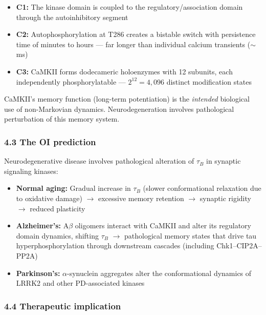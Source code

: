 \documentclass[
  11pt,
]{article}
\providecommand{\tightlist}{%
  \setlength{\itemsep}{0pt}\setlength{\parskip}{0pt}}
\begin{document}
\begin{itemize}
\tightlist
\item
  \textbf{C1:} The kinase domain is coupled to the
  regulatory/association domain through the autoinhibitory segment
\item
  \textbf{C2:} Autophosphorylation at T286 creates a bistable switch
  with persistence time of minutes to hours --- far longer than
  individual calcium transients (\(\sim\)ms)
\item
  \textbf{C3:} CaMKII forms dodecameric holoenzymes with 12 subunits,
  each independently phosphorylatable --- \(2^{12} = 4{,}096\) distinct
  modification states
\end{itemize}

CaMKII's memory function (long-term potentiation) is the \emph{intended}
biological use of non-Markovian dynamics. Neurodegeneration involves
pathological perturbation of this memory system.

\hypertarget{the-oi-prediction}{%
\subsubsection{4.3 The OI prediction}\label{the-oi-prediction}}

Neurodegenerative disease involves pathological alteration of \(\tau_B\)
in synaptic signaling kinases:

\begin{itemize}
\tightlist
\item
  \textbf{Normal aging:} Gradual increase in \(\tau_B\) (slower
  conformational relaxation due to oxidative damage) \(\to\) excessive
  memory retention \(\to\) synaptic rigidity \(\to\) reduced plasticity
\item
  \textbf{Alzheimer's:} A\(\beta\) oligomers interact with CaMKII and
  alter its regulatory domain dynamics, shifting \(\tau_B\) \(\to\)
  pathological memory states that drive tau hyperphosphorylation through
  downstream cascades (including Chk1--CIP2A--PP2A)
\item
  \textbf{Parkinson's:} \(\alpha\)-synuclein aggregates alter the
  conformational dynamics of LRRK2 and other PD-associated kinases
\end{itemize}

\hypertarget{therapeutic-implication}{%
\subsubsection{4.4 Therapeutic
implication}\label{therapeutic-implication}}
\end{document}
